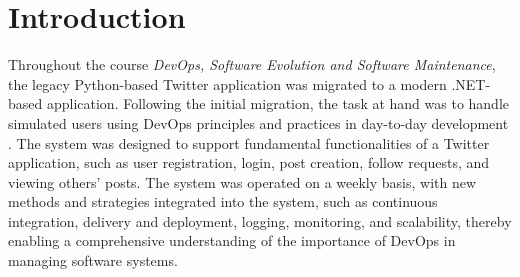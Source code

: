 \chapter{Introduction}

Throughout the course \textit{DevOps, Software Evolution and Software Maintenance}, the legacy Python-based Twitter application was migrated to a modern .NET-based application. Following the initial migration, the task at hand was to handle simulated users using DevOps principles and practices in day-to-day development \cite{McCauley}. The system was designed to support fundamental functionalities of a Twitter application, such as user registration, login, post creation, follow requests, and viewing others' posts. The system was operated on a weekly basis, with new methods and strategies integrated into the system, such as continuous integration, delivery and deployment, logging, monitoring, and scalability, thereby enabling a comprehensive understanding of the importance of DevOps in managing software systems.